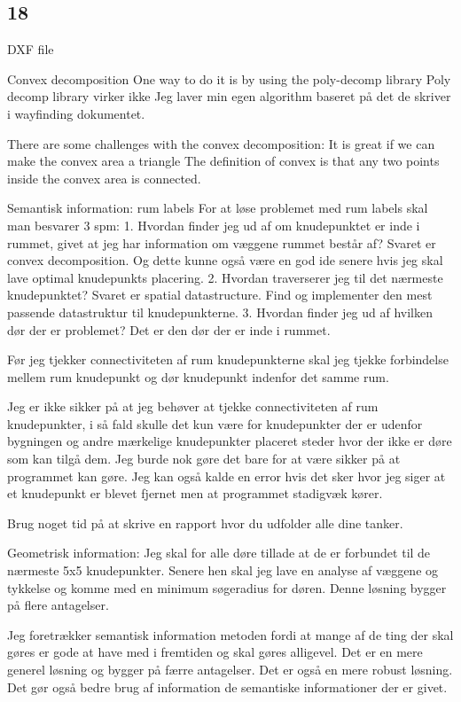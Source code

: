 \subsection{18}
DXF file

Convex decomposition
One way to do it is by using the poly-decomp library
Poly decomp library virker ikke
Jeg laver min egen algorithm baseret på det de skriver i wayfinding dokumentet.

There are some challenges with the convex decomposition:
It is great if we can make the convex area a triangle
The definition of convex is that any two points inside the convex area is connected.

Semantisk information: rum labels
For at løse problemet med rum labels skal man besvarer 3 spm:
1. Hvordan finder jeg ud af om knudepunktet er inde i rummet, givet at jeg har information om væggene rummet består af?
Svaret er convex decomposition. Og dette kunne også være en god ide senere hvis jeg skal lave optimal knudepunkts placering.
2. Hvordan traverserer jeg til det nærmeste knudepunktet?
Svaret er spatial datastructure. Find og implementer den mest passende datastruktur til knudepunkterne.
3. Hvordan finder jeg ud af hvilken dør der er problemet?
Det er den dør der er inde i rummet.



Før jeg tjekker connectiviteten af rum knudepunkterne skal jeg tjekke forbindelse mellem rum knudepunkt og dør knudepunkt indenfor det samme rum.

Jeg er ikke sikker på at jeg behøver at tjekke connectiviteten af rum knudepunkter, i så fald skulle det kun være for knudepunkter der er udenfor bygningen og andre mærkelige knudepunkter placeret steder hvor der ikke er døre som kan tilgå dem. Jeg burde nok gøre det bare for at være sikker på at programmet kan gøre. Jeg kan også kalde en error hvis det sker hvor jeg siger at et knudepunkt er blevet fjernet men at programmet stadigvæk kører.

Brug noget tid på at skrive en rapport hvor du udfolder alle dine tanker.

Geometrisk information:
Jeg skal for alle døre tillade at de er forbundet til de nærmeste 5x5 knudepunkter.
Senere hen skal jeg lave en analyse af væggene og tykkelse og komme med en minimum søgeradius for døren.
Denne løsning bygger på flere antagelser.

Jeg foretrækker semantisk information metoden fordi at mange af de ting der skal gøres er gode at have med i fremtiden og skal gøres alligevel. Det er en mere generel løsning og bygger på færre antagelser. Det er også en mere robust løsning. Det gør også bedre brug af information de semantiske informationer der er givet.

